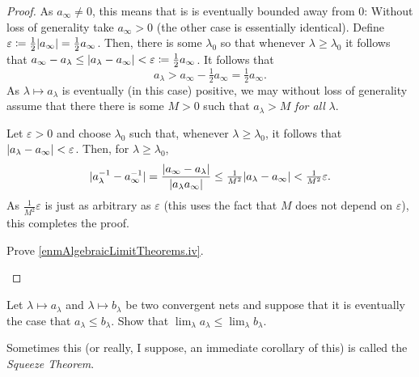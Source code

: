 \begin{prp}
\begin{savenotes}
\begin{proof}
As $a_\infty \neq 0$, this means that is is eventually bounded away from $0$:  Without loss of generality take $a_\infty >0$ (the other case is essentially identical).  Define $\varepsilon \coloneqq \frac{1}{2}\lvert a_\infty\rvert=\frac{1}{2}a_\infty$.  Then, there is some $\lambda _0$ so that whenever $\lambda \geq \lambda _0$ it follows that $a_\infty -a_\lambda \leq \lvert a_\lambda -a_\infty\rvert<\varepsilon \coloneqq \frac{1}{2}a_\infty$.  It follows that
\begin{equation}
a_\lambda >a_\infty -\tfrac{1}{2}a_\infty =\tfrac{1}{2}a_\infty.
\end{equation}
As $\lambda \mapsto a_\lambda$ is eventually (in this case) positive, we may without loss of generality assume that there there is some $M>0$ such that $a_\lambda >M$ \emph{for all} $\lambda$.

Let $\varepsilon >0$ and choose $\lambda _0$ such that, whenever $\lambda \geq \lambda _0$, it follows that $\lvert a_\lambda -a_\infty\rvert<\varepsilon$.  Then, for $\lambda \geq \lambda _0$,
\begin{equation}
\lvert a_\lambda ^{-1}-a_\infty ^{-1}\rvert=\frac{\lvert a_\infty -a_\lambda\rvert}{\lvert a_\lambda a_\infty\rvert}\leq \tfrac{1}{M^2}\lvert a_\lambda -a_\infty\rvert<\tfrac{1}{M^2}\varepsilon .
\end{equation}
As $\frac{1}{M^2}\varepsilon$ is just as arbitrary as $\varepsilon$ (this uses the fact that $M$ does not depend on $\varepsilon$), this completes the proof.
\begin{exr}
Prove \ref{enmAlgebraicLimitTheorems.iv}.
\end{exr}
\end{proof}
\end{savenotes}
\end{prp}
\begin{exr}\label{exr3.3.30}
Let $\lambda \mapsto a_\lambda$ and $\lambda \mapsto b_\lambda$ be two convergent nets and suppose that it is eventually the case that $a_\lambda \leq b_\lambda$.  Show that $\lim _\lambda a_\lambda \leq \lim _\lambda b_\lambda$.
\begin{rmk}
Sometimes this (or really, I suppose, an immediate corollary of this) is called the \emph{Squeeze Theorem}.
\end{rmk}
\end{exr}

\horizontalrule


